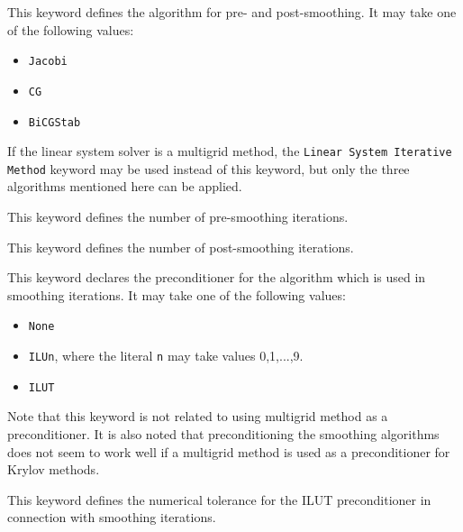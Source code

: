This keyword defines the algorithm for pre- and  
post-smoothing. It may take one of the following values:
\begin{itemize}
\item {\tt Jacobi}
\item {\tt CG}
\item {\tt BiCGStab}
\end{itemize}
If the linear system solver is a multigrid method,
the {\tt Linear System Iterative Method} keyword may be used instead of this keyword, 
but only the three algorithms mentioned here can be applied.

This keyword defines the number of pre-smoothing iterations.

This keyword defines the number of post-smoothing iterations.

This keyword declares the preconditioner for the algorithm which is used in
smoothing iterations. It may take one of the following values:
\begin{itemize}
\item {\tt None}
\item {\tt ILUn}, where the literal {\tt n} may take values 0,1,...,9.
\item {\tt ILUT}
\end{itemize}
Note that this keyword is not related to using multigrid method as a preconditioner. 
It is also noted that preconditioning the smoothing algorithms 
does not seem to work well if a multigrid method is used as a preconditioner for 
Krylov methods.

This keyword defines the numerical tolerance for the ILUT preconditioner 
in connection with smoothing iterations.

\sifend

